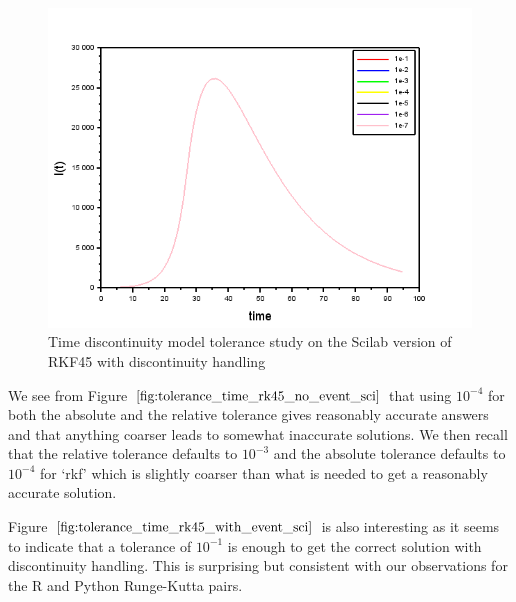 \begin{figure}[H]
\centering
\includegraphics[width=0.7\linewidth]{./figures/tolerance_time_rk45_with_event_sci}
\caption{Time discontinuity model tolerance study on the Scilab version of RKF45 with discontinuity handling}
\label{fig:tolerance_time_rk45_with_event_sci}
\end{figure}

We see from Figure $\ref{fig:tolerance_time_rk45_no_event_sci}$ that using $10^{-4}$ for both the absolute and the relative tolerance gives reasonably accurate answers and that anything coarser leads to somewhat inaccurate solutions. We then recall that the relative tolerance defaults to $10^{-3}$ and the absolute tolerance defaults to $10^{-4}$ for `rkf' which is slightly coarser than what is needed to get a reasonably accurate solution.

Figure $\ref{fig:tolerance_time_rk45_with_event_sci}$ is also interesting as it seems to indicate that a tolerance of $10^{-1}$ is enough to get the correct solution with discontinuity handling. This is surprising but consistent with our observations for the R and Python Runge-Kutta pairs.

